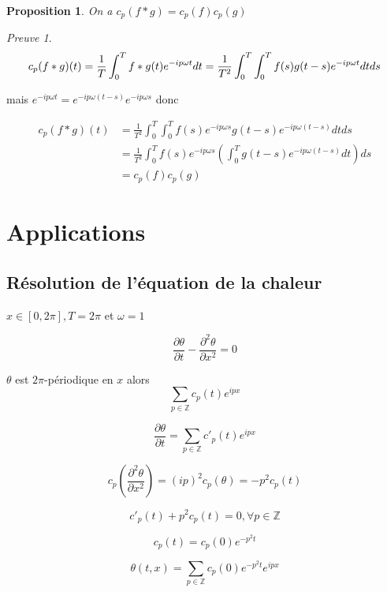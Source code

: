 \documentclass[]{article}
\newtheorem{myproposition}{Proposition}
\theoremstyle{remark}
\newtheorem{myproof}{Preuve}
\theoremstyle{definition}
\begin{document}
\begin{myproposition}
	On a $c_p(f * g) = c_p(f) c_p(g)$
\end{myproposition}

\begin{myproof}
	$$c_p(f * g)(t) = \frac{1}{T} \int_{0}^{T} f * g(t) e^{- i p \omega t} dt \\
	= \frac{1}{T^2} \int_{0}^{T} \int_{0}^{T} f(s) g(t - s) e^{- i p \omega t} dt ds$$
	
	mais $e^{-i p \omega t} = e^{-i p \omega (t - s)} e^{- i p \omega s}$ donc
	
	$$
	\begin{aligned}
	c_p(f * g)(t) &= \frac{1}{T^2} \int_{0}^{T} \int_{0}^{T} f(s) e^{-i p \omega s} g(t - s) e^{- i p \omega (t-s)} dt ds \\
	&= \frac{1}{T^2} \int_{0}^{T} f(s) e^{- i p \omega s} \left(\int_{0}^{T} g(t - s) e^{- i p \omega (t - s)} dt\right) ds \\
	&=c_p(f) c_p(g)
	\end{aligned}$$
\end{myproof}

\section{Applications}

\subsection{Résolution de l'équation de la chaleur}

$x\in[0, 2 \pi], T = 2 \pi$ et $\omega = 1$

\begin{equation}
	\frac{\partial \theta}{\partial t} - \frac{\partial^2 \theta}{\partial x^2} = 0
\end{equation}

$\theta$ est $2 \pi$-périodique en $x$ alors $$\sum_{p \in \mathbb{Z}} c_p(t) e^{i p x}$$

$$\frac{\partial \theta}{\partial t} = \sum_{p \in \mathbb{Z}} c'_p(t) e^{i p x}$$

$$c_p\left(\frac{\partial^2 \theta}{\partial x^2}\right) = (ip)^2c_p(\theta) = -p^2 c_p(t)$$

$$c'_p(t) + p^2 c_p(t) = 0, \forall p \in \mathbb{Z}$$

$$c_p(t) = c_p(0) e^{-p^2 t}$$

$$\theta(t, x) = \sum_{p \in \mathbb{Z}} c_p(0) e^{-p^2 t} e^{i p x}$$
\end{document}
